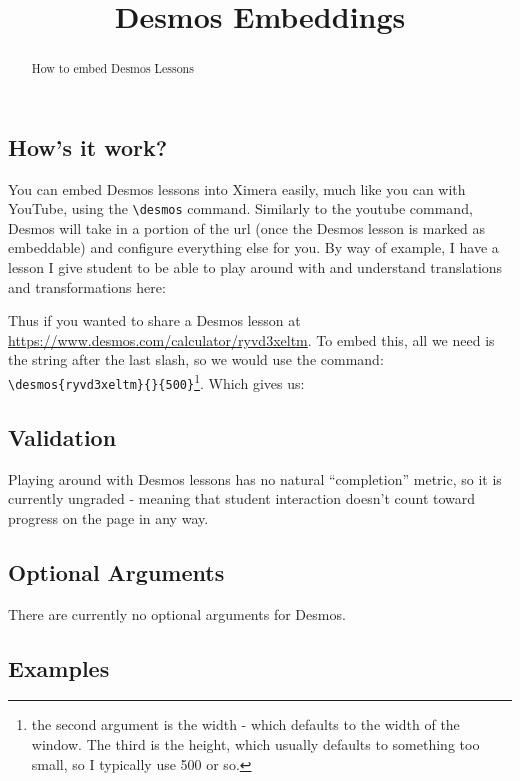 \documentclass{ximera}
\title{Desmos Embeddings}
\begin{document}
\begin{abstract}
    How to embed Desmos Lessons
\end{abstract}
\maketitle

    \subsection*{How's it work?}
    
        You can embed Desmos lessons into Ximera easily, much like you can with YouTube, using the \verb|\desmos| command. Similarly to the youtube command, Desmos will take in a portion of the url (once the Desmos lesson is marked as embeddable) and configure everything else for you. By way of example, I have a lesson I give student to be able to play around with and understand translations and transformations here: 
        
        Thus if you wanted to share a Desmos lesson at \url{https://www.desmos.com/calculator/ryvd3xeltm}. To embed this, all we need is the string after the last slash, so we would use the command: \\ \verb|\desmos{ryvd3xeltm}{}{500}|\footnote{the second argument is the width - which defaults to the width of the window. The third is the height, which usually defaults to something too small, so I typically use 500 or so.}. Which gives us:
    
    
    \subsection*{Validation}
        Playing around with Desmos lessons has no natural ``completion'' metric, so it is currently ungraded - meaning that student interaction doesn't count toward progress on the page in any way.
    
        
    \subsection*{Optional Arguments}
        There are currently no optional arguments for Desmos.
    
    \subsection*{Examples}
    
\end{document}
